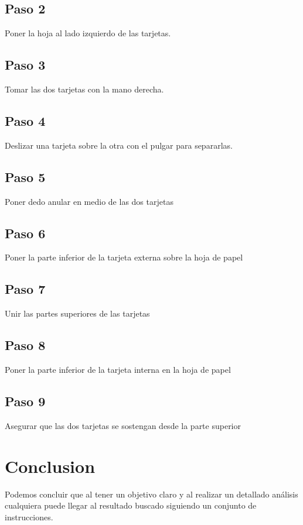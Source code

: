 \documentclass{article}
\begin{document}
\subsection{Paso 2}
Poner la hoja al lado izquierdo de las tarjetas.


\subsection{Paso 3}
Tomar las dos tarjetas con la mano derecha.

\subsection{Paso 4}
Deslizar una tarjeta sobre la otra con el pulgar para separarlas.

\subsection{Paso 5}
Poner dedo anular en medio de las dos tarjetas

\subsection{Paso 6}
Poner la parte inferior de la tarjeta externa sobre la hoja de papel

\subsection{Paso 7}
Unir las partes superiores de las tarjetas

\subsection{Paso 8}
Poner la parte inferior de la tarjeta interna en la hoja de papel 

\subsection{Paso 9}
Asegurar que las dos tarjetas se sostengan desde la parte superior



\section{Conclusion}
Podemos concluir que al tener un objetivo claro y al realizar un detallado análisis cualquiera puede llegar al resultado buscado siguiendo un conjunto de instrucciones.




\end{document}
